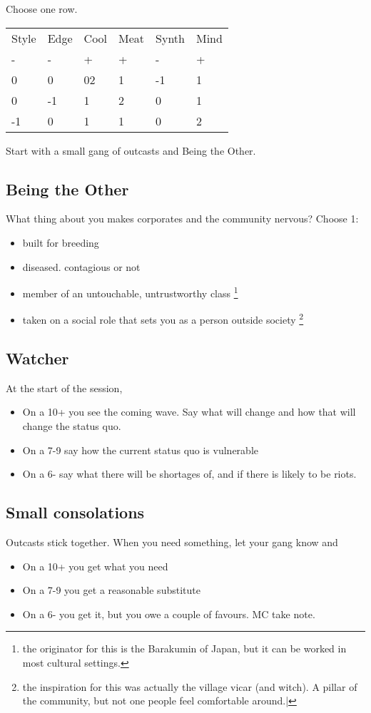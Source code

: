 \documentclass{tufte-book}
\begin{document}
Choose one row.
\begin{table}[ht]
\centering
{}\selectfont
\begin{tabular}{llllll}
\toprule
Style 	& Edge & Cool & Meat & Synth & Mind\\
- 	&- 	&+ 	&	+&	-&	+\\
\midrule
0&0&02&1&-1&1\\
0&-1&1&2&0&1\\
-1&0&1&1&0&2\\
\bottomrule
\end{tabular}
\end{table}

Start with a small gang of outcasts and Being the Other.

\subsection{Being the Other}
What thing about you makes corporates and the community nervous?
Choose 1:
\begin{itemize}
\item built for breeding
\item diseased. contagious or not
\item member of an untouchable, untrustworthy class \footnote{the originator for this is the Barakumin of Japan, but it can be worked in most cultural settings.}
\item taken on a social role that sets you as a person outside society \footnote {the inspiration for this was actually the village vicar (and witch). A pillar of the community, but not one people feel comfortable around.|}
\end{itemize}


\subsection{Watcher}
At the start of the session, 
\begin{itemize}
\item On a 10+ you see the coming wave. Say what will change and how that will change the status quo.
\item On a 7-9 say how the current status quo is vulnerable
\item On a 6- say what there will be shortages of, and if there is likely to be riots.
\end{itemize}

\subsection{Small consolations}
Outcasts stick together. When you need something, let your gang know and 
\begin{itemize}
\item On a 10+ you get what you need
\item On a 7-9 you get a reasonable substitute
\item On a 6- you get it, but you owe a couple of favours. MC take note.
\end{itemize}
\end{document}
